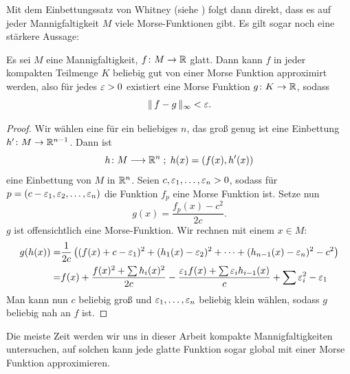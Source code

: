 \begin{remark}
    Mit dem Einbettungssatz von Whitney (siehe \cite{whitney}) folgt dann direkt, dass es auf 
    jeder Mannigfaltigkeit $M$ viele Morse-Funktionen gibt. Es gilt sogar noch eine stärkere 
    Aussage:
\end{remark}

\begin{prop}
    \label{prop: morse-approximation}
    Es sei $M$ eine Mannigfaltigkeit, $f \colon M \to { \mathbb R }$ glatt. Dann kann $f$ in jeder kompakten
    Teilmenge $K$ beliebig gut von einer Morse Funktion approximirt werden, also für jedes 
    $\varepsilon > 0$ existiert eine Morse Funktion $g \colon K \to { \mathbb R }$, sodass 
    \[ \| \, f - g \, \|_{\infty} < \varepsilon . \]
\end{prop}

\begin{proof}
    Wir wählen eine für ein beliebiges $n$, das groß genug ist eine Einbettung 
    $h' \colon M \to { \mathbb R }^{n - 1}$. Dann ist 
    \[ h \colon M \longrightarrow { \mathbb R }^n \; ; \; h(x) = (f(x), h'(x)) \]
    eine Einbettung von $M$ in ${ \mathbb R }^n$. Seien $c, \varepsilon_1, \dots, \varepsilon_n > 0$, sodass für \\
    $p = (c - \varepsilon_1, \varepsilon_2, \dots, \varepsilon_n)$ die Funktion $f_p$ eine Morse Funktion ist.
    Setze nun 
    \[ g(x) = \frac{f_p(x) - c^2}{2c} . \]
    $g$ ist offensichtlich eine Morse-Funktion. Wir rechnen mit einem $x \in M$:
    \begin{align*}
        g(h(x)) = & \frac{1}{2c} \left( (f(x) + c - \varepsilon_1)^2 + (h_1(x) - \varepsilon_2)^2 
            + \dots + (h_{n-1}(x) - \varepsilon_n)^2 - c^2 \right) \\
        = & f(x) + \frac{f(x)^2 + \sum h_i(x)^2}{2c} - \frac{\varepsilon_1 f(x) 
            + \sum \varepsilon_i h_{i - 1}(x)}{c} + \sum \varepsilon_i^2 - \varepsilon_1
    \end{align*}
    Man kann nun $c$ beliebig groß und $\varepsilon_1, \dots, \varepsilon_n$ beliebig klein wählen,
    sodass $g$ beliebig nah an $f$ ist.
\end{proof}

Die meiste Zeit werden wir uns in dieser Arbeit kompakte Mannigfaltigkeiten untersuchen,
auf solchen kann jede glatte Funktion sogar global mit einer Morse Funktion approximieren.
